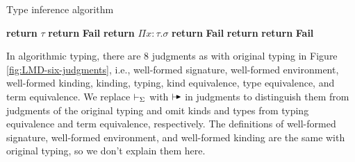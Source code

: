 \begin{algorithm}
    \caption{Type inference algorithm}\label{alg:type-inference}
    \begin{algorithmic}[1]
        \State \textbf{return} $\tau$
        \Else
        \State \textbf{return} \textbf{Fail}
        \EndIf
        \State \textbf{return} $\Pi x:\tau.\sigma$
        \Else
        \State \textbf{return} \textbf{Fail}
        \EndIf
        \State \textbf{return} 
        \Else
        \State \textbf{return} \textbf{Fail}
        \EndIf
        \State {}
        \EndIf
        \EndProcedure
    \end{algorithmic}
\end{algorithm}



In algorithmic typing, there are 8 judgments as with original typing in Figure
\ref{fig:LMD-six-judgments}, i.e., well-formed signature, well-formed
environment, well-formed kinding, kinding, typing, kind equivalence, type
equivalence, and term equivalence. We replace \( \vdash_\Sigma \) with \( \AV \) in
judgments to distinguish them from judgments of the original typing and omit
kinds and types from typing equivalence and term equivalence, respectively. The
definitions of well-formed signature, well-formed environment, and well-formed
kinding are the same with original typing, so we don't explain them here.


